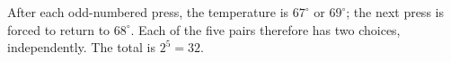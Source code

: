 After each odd-numbered press, the temperature is $67^\circ$ or $69^\circ$; the next press is forced to return to $68^\circ$. Each of the five pairs therefore has two choices, independently. The total is $\boxed{2^5=32}$.
